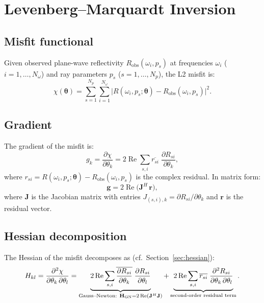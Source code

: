 \documentclass[11pt,a4paper]{article}
\newcommand{\ppd}[2]{\frac{\partial #1}{\partial #2}}
\theoremstyle{plain}
\theoremstyle{remark}
\begin{document}
\section{Levenberg--Marquardt Inversion}\label{sec:inversion}

\subsection{Misfit functional}\label{sec:misfit}

Given observed plane-wave reflectivity $R_{\text{obs}}(\omega_i, p_s)$
at frequencies $\omega_i$ ($i = 1,\dotsc,N_\omega$) and ray parameters
$p_s$ ($s = 1,\dotsc,N_p$), the L2 misfit is:
\begin{equation}\label{eq:misfit}
  \chi(\bm{\theta})
  = \sum_{s=1}^{N_p}\sum_{i=1}^{N_\omega}
    \bigl|R(\omega_i, p_s;\bm{\theta})
          - R_{\text{obs}}(\omega_i, p_s)\bigr|^2.
\end{equation}

\subsection{Gradient}\label{sec:gradient}

The gradient of the misfit is:
\begin{equation}\label{eq:grad}
  g_k
  = \ppd{\chi}{\theta_k}
  = 2\operatorname{Re}\sum_{s,i}
    \overline{r_{si}}\;\ppd{R_{si}}{\theta_k},
\end{equation}
where $r_{si} = R(\omega_i,p_s;\bm{\theta})
- R_{\text{obs}}(\omega_i,p_s)$ is the complex residual.  In matrix
form:
\begin{equation}\label{eq:grad-mat}
  \mathbf{g} = 2\operatorname{Re}\bigl(\mathbf{J}^H\,\mathbf{r}\bigr),
\end{equation}
where $\mathbf{J}$ is the Jacobian matrix with entries
$J_{(s,i),k} = \partial R_{si}/\partial\theta_k$ and
$\mathbf{r}$ is the residual vector.

\subsection{Hessian decomposition}\label{sec:hess-decomp}

The Hessian of the misfit decomposes as (cf.~Section~\ref{sec:hessian}):
\begin{equation}\label{eq:hess-full}
  H_{kl}
  = \ppd{{}^2\chi}{\theta_k\,\partial\theta_l}
  = \underbrace{%
    2\operatorname{Re}\sum_{s,i}
    \overline{\ppd{R_{si}}{\theta_k}}\;\ppd{R_{si}}{\theta_l}
  }_{\text{Gauss--Newton: } \mathbf{H}_{\text{GN}} = 2\operatorname{Re}(\mathbf{J}^H\mathbf{J})}
  + \underbrace{%
    2\operatorname{Re}\sum_{s,i}
    \overline{r_{si}}\;\ppd{{}^2 R_{si}}{\theta_k\,\partial\theta_l}
  }_{\text{second-order residual term}}.
\end{equation}
\end{document}
